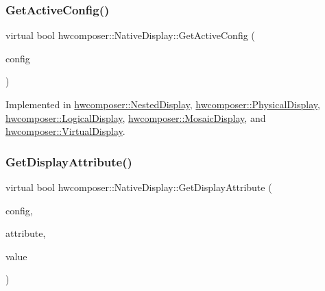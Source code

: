 \subsubsection{\texorpdfstring{Get\+Active\+Config()}{GetActiveConfig()}}
{\footnotesize\ttfamily virtual bool hwcomposer\+::\+Native\+Display\+::\+Get\+Active\+Config (\begin{DoxyParamCaption}\item[{uint32\+\_\+t $\ast$}]{config }\end{DoxyParamCaption})\hspace{0.3cm}{\ttfamily [pure virtual]}}



Implemented in \mbox{\hyperlink{classhwcomposer_1_1NestedDisplay_ac29629de6ce1e74a1086e8de7239b45a}{hwcomposer\+::\+Nested\+Display}}, \mbox{\hyperlink{classhwcomposer_1_1PhysicalDisplay_a6dfc5d017719115af233f12911c71d84}{hwcomposer\+::\+Physical\+Display}}, \mbox{\hyperlink{classhwcomposer_1_1LogicalDisplay_a8a88b08fd54dd02debe436718c569fff}{hwcomposer\+::\+Logical\+Display}}, \mbox{\hyperlink{classhwcomposer_1_1MosaicDisplay_a6283bdb8c3f0ababbb224d71726f4d2c}{hwcomposer\+::\+Mosaic\+Display}}, and \mbox{\hyperlink{classhwcomposer_1_1VirtualDisplay_aec4f2f29aebee6947f69920ec832a655}{hwcomposer\+::\+Virtual\+Display}}.

\mbox{\label{classhwcomposer_1_1NativeDisplay_aeb880e4a295eab49a98804380c2dcb84}} 
\subsubsection{\texorpdfstring{Get\+Display\+Attribute()}{GetDisplayAttribute()}}
{\footnotesize\ttfamily virtual bool hwcomposer\+::\+Native\+Display\+::\+Get\+Display\+Attribute (\begin{DoxyParamCaption}\item[{uint32\+\_\+t}]{config,  }\item[{H\+W\+C\+Display\+Attribute}]{attribute,  }\item[{int32\+\_\+t $\ast$}]{value }\end{DoxyParamCaption})\hspace{0.3cm}{\ttfamily [pure virtual]}}



